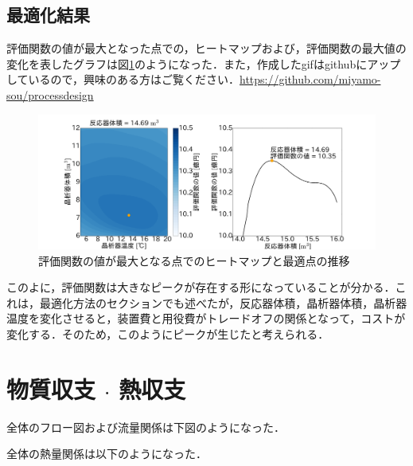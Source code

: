 \documentclass[a4j]{jsreport}
\begin{document}
\section{最適化結果}
評価関数の値が最大となった点での，ヒートマップおよび，評価関数の最大値の変化を表したグラフは図\ref{最適化結果}のようになった．また，作成したgifはgithubにアップしているので，興味のある方はご覧ください．\url{https://github.com/miyamo-sou/processdesign}
\begin{figure}[htbp]
    \label{最適化結果}
    \begin{center}
        \includegraphics[scale=0.1]{snapshot.png}
        \caption{評価関数の値が最大となる点でのヒートマップと最適点の推移}
    \end{center}
\end{figure}

このよに，評価関数は大きなピークが存在する形になっていることが分かる．これは，最適化方法のセクションでも述べたが，反応器体積，晶析器体積，晶析器温度を変化させると，装置費と用役費がトレードオフの関係となって，コストが変化する．そのため，このようにピークが生じたと考えられる．

\newpage
\chapter{物質収支 $\cdot$ 熱収支}
全体のフロー図および流量関係は下図のようになった．

全体の熱量関係は以下のようになった．

\newpage
\end{document}
